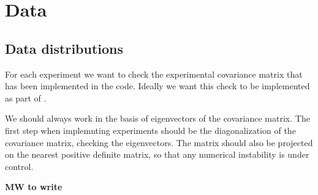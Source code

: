 \section{Data}
\label{sec:data}

\subsection{Data distributions}
\label{eq:data-distr}
For each experiment we want to check the experimental covariance matrix that has
been implemented in the \nnpdf code. Ideally we want this check to be
implemented as part of \valid. 

We should always work in the basis of eigenvectors of the covariance matrix. The
first step when implemnting experiments should be the diagonalization of the
covariance matrix, checking the eigenvectors. The matrix should also be
projected on the nearest positive definite matrix, so that any numerical
instability is under control. 

{\bf MW to write}